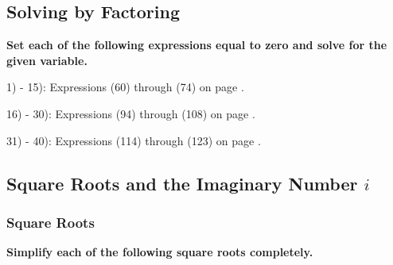 \documentclass[12pt]{book}
\theoremstyle{definition}
\begin{document}
\subsection*{Solving by Factoring}

{\bf Set each of the following expressions equal to zero and solve for the given variable.}\par

1) - 15): Expressions (60) through (74) on page \pageref{ais1}.\par

16) - 30): Expressions (94) through (108) on page \pageref{aisnot1}.\par

31) - 40): Expressions (114) through (123) on page \pageref{aisnot1}.

\subsection*{Square Roots and the Imaginary Number $i$}

\subsubsection{Square Roots}

{\bf Simplify each of the following square roots completely.}
\end{document}
